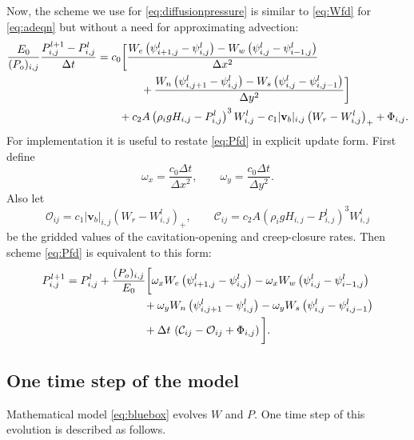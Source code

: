 \documentclass[11pt,final]{amsart}%
\newcommand\bv{\mathbf{v}}
\newcommand{\Wlij}{W^l_{i,j}}
\newcommand{\Plij}{P^l_{i,j}}
\begin{document}
Now, the scheme we use for \eqref{eq:diffusionpressure} is similar to \eqref{eq:Wfd} for \eqref{eq:adeqn} but without a need for approximating advection:
\begin{align}
\frac{E_0}{(P_o)_{i,j}} \frac{P_{i,j}^{l+1} - \Plij}{\Delta t} &= c_0 \bigg[\frac{W_e \left(\psi_{i+1,j}^l - \psi_{i,j}^l\right) - W_w \left(\psi_{i,j}^l - \psi_{i-1,j}^l\right)}{\Delta x^2}  \label{eq:Pfd} \\
      &\qquad\qquad + \frac{W_n \left(\psi_{i,j+1}^l - \psi_{i,j}^l\right) - W_s \left(\psi_{i,j}^l - \psi_{i,j-1}^l\right)}{\Delta y^2}\bigg] \notag \\
      &\qquad + c_2 A \left(\rho_i g H_{i,j}- \Plij\right)^3 \Wlij - c_1 |\bv_b|_{i,j} \left(W_r - \Wlij\right)_+ + \Phi_{i,j}. \notag
\end{align}
For implementation it is useful to restate \eqref{eq:Pfd} in explicit update form.  First define
	$$\omega_x = \frac{c_0 \Delta t}{\Delta x^2}, \qquad \omega_y = \frac{c_0 \Delta t}{\Delta y^2}.$$
Also let
	$$\mathcal{O}_{ij} = c_1 |\bv_b|_{i,j} \left(W_r - \Wlij\right)_+, \qquad \mathcal{C}_{ij} = c_2 A \left(\rho_i g H_{i,j} - \Plij\right)^3 \Wlij$$
be the gridded values of the cavitation-opening and creep-closure rates.  Then scheme \eqref{eq:Pfd} is equivalent to this form:
\begin{align}
P_{i,j}^{l+1} &= \Plij +  \frac{(P_o)_{i,j}}{E_0} \bigg[\omega_x W_e \left(\psi_{i+1,j}^l - \psi_{i,j}^l\right) - \omega_x W_w \left(\psi_{i,j}^l - \psi_{i-1,j}^l\right) \label{eq:Pfdupdate} \\
      &\qquad\qquad\qquad\quad + \omega_y W_n \left(\psi_{i,j+1}^l - \psi_{i,j}^l\right) - \omega_y W_s \left(\psi_{i,j}^l - \psi_{i,j-1}^l\right) \notag \\
      &\qquad\qquad\qquad\quad + \Delta t\, \left(\mathcal{C}_{ij} - \mathcal{O}_{ij} + \Phi_{i,j}\right)\bigg]. \notag
\end{align}

\subsection*{One time step of the model}  Mathematical model \eqref{eq:bluebox} evolves $W$ and $P$.  One time step of this evolution is described as follows.
\end{document}

